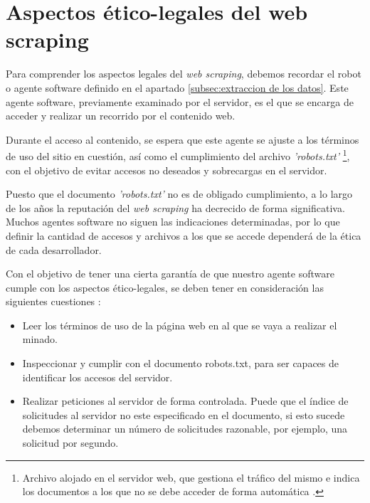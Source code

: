 \section{Aspectos ético-legales del web scraping}
\label{sec:aspectos etico-legales del web scraping}

Para comprender los aspectos legales del \emph{web scraping}, debemos recordar el robot o agente software
definido en el apartado \ref{subsec:extraccion de los datos}. Este agente software, previamente examinado 
por el servidor, es el que se encarga de acceder y realizar un recorrido por el contenido web.

Durante el acceso al contenido, se espera que este agente se ajuste a los términos de uso del sitio en
cuestión, así como el cumplimiento del archivo \emph{'robots.txt'} \footnote{Archivo alojado en el
servidor web, que gestiona el tráfico del mismo e indica los documentos a los que no se debe acceder de
forma automática \cite{robots-txt}.}, con el objetivo de evitar accesos no deseados y sobrecargas en el
servidor.

Puesto que el documento \emph{'robots.txt'} no es de obligado cumplimiento, a lo largo de los años la
reputación del \emph{web scraping} ha decrecido de forma significativa. Muchos agentes software no siguen 
las indicaciones determinadas, por lo que definir la cantidad de accesos y archivos a los que se accede
dependerá de la ética de cada desarrollador.

Con el objetivo de tener una cierta garantía de que nuestro agente software cumple con los aspectos
ético-legales, se deben tener en consideración las siguientes cuestiones \cite{legalidad-web-scraping}:

\begin{itemize}
    \item Leer los términos de uso de la página web en al que se vaya a realizar el minado.

    \item Inspeccionar y cumplir con el documento robots.txt, para ser capaces de identificar los accesos
    del servidor.

    \item Realizar peticiones al servidor de forma controlada. Puede que el índice de solicitudes al 
    servidor no este especificado en el documento, si esto sucede debemos determinar un número de solicitudes 
    razonable, por ejemplo, una solicitud por segundo.
\end{itemize}

















